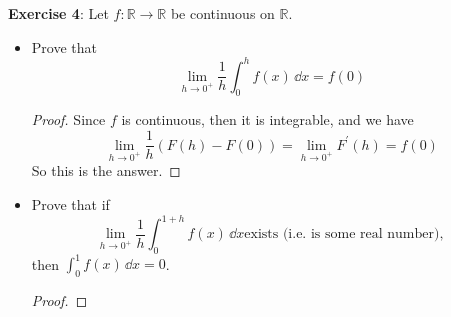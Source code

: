 \documentclass{article}
\begin{document}
\textbf{Exercise 4}: Let $f : \mathbb{R} \rightarrow \mathbb{R}$ be continuous on $\mathbb{R}$. 
    \begin{itemize}
        \item Prove that
            \begin{equation*}
                \lim_{h \to 0^{+}}\dfrac{1}{h} \int_{0}^{h} f(x) \, \dd{x}  = f(0)
            \end{equation*}
                \begin{proof}
                    Since $f$ is continuous, then it is integrable, and we have
                        \begin{equation*}
                            \lim\limits_{h \to 0^{+}}\dfrac{1}{h}(F(h) - F(0)) = \lim\limits_{h \to 0^{+}}F^{\prime}(h) = f(0)
                        \end{equation*}
                    So this is the answer.
                \end{proof}

        \item Prove that if 
            \begin{equation*}
                \lim_{h \to 0^{+}} \dfrac{1}{h}\int_{0}^{1 + h} f(x) \, \dd{x}  \text{exists (i.e. is some real number), }
            \end{equation*}
        then $\int_{0}^{1} f(x) \, \dd{x} = 0$. 
            \begin{proof}
                
            \end{proof}
    \end{itemize}
\end{document}
